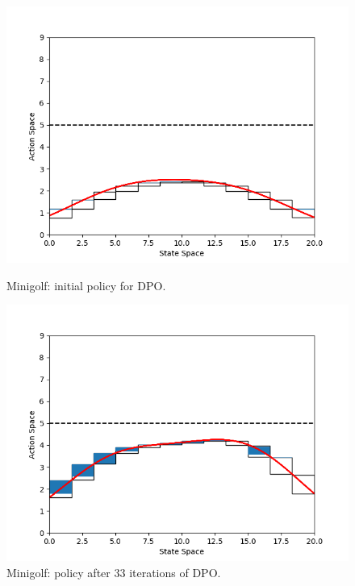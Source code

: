 \begin{figure}[h!]
	\centering
	\begin{minipage}[t]{.48\columnwidth}
		\includegraphics[width=\textwidth]{plots/it0.png}
		\caption{Minigolf: initial policy for DPO.}
		\label{fig:mg0}
	\end{minipage}%
	\hfill
	\begin{minipage}[t]{.48\columnwidth}
		\includegraphics[width=\textwidth]{plots/it33.png}
		\caption{Minigolf: policy after $33$ iterations of DPO.}
		\label{fig:mg33}
	\end{minipage}
\end{figure}
